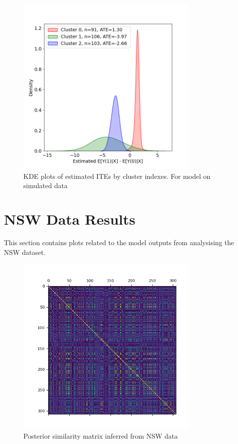 \documentclass{article}
\begin{document}
\begin{figure}[h]
  \centering
  \includegraphics[width=0.8\textwidth]{Plots/Simulated_output_histogram.png}
  \caption{KDE plots of estimated ITEs by cluster indexes. For model on simulated data}
  \label{fig:sim_histo}
\end{figure}


\section{NSW Data Results}
This section contains plots related to the model outputs from analysising the NSW dataset.
\begin{figure}[h]
  \centering
  \includegraphics[width=0.8\textwidth]{Plots/NSW Posterior Similarity Matrix.png}
  \caption{Posterior similarity matrix inferred from NSW data}
  \label{fig:nsw_post_mat}
\end{figure}
\end{document}

